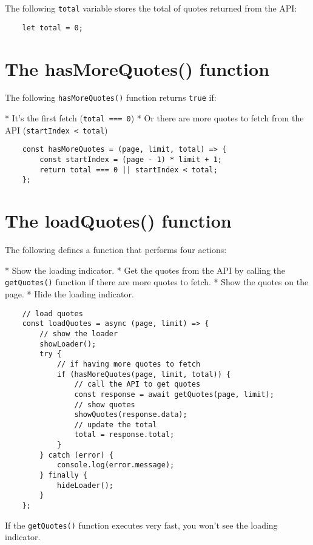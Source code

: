 \documentclass[11pt]{article}
\begin{document}
\noindent
The following \verb|total| variable stores the total of quotes
returned from the API:

\begin{lstlisting}
    let total = 0;
\end{lstlisting}

\section*{The hasMoreQuotes() function}

The following \verb|hasMoreQuotes()| function returns \verb|true| if:

* It's the first fetch (\verb|total === 0|)
* Or there are more quotes to fetch from the API (\verb|startIndex < total|)

\begin{lstlisting}
    const hasMoreQuotes = (page, limit, total) => {
        const startIndex = (page - 1) * limit + 1;
        return total === 0 || startIndex < total;
    };
\end{lstlisting}

\section*{The loadQuotes() function}

The following defines a function that performs four actions:

* Show the loading indicator.
* Get the quotes from the API by calling the \verb|getQuotes()| function
if there are more quotes to fetch.
* Show the quotes on the page.
* Hide the loading indicator.

\begin{lstlisting}
    // load quotes
    const loadQuotes = async (page, limit) => {
        // show the loader
        showLoader();
        try {
            // if having more quotes to fetch
            if (hasMoreQuotes(page, limit, total)) {
                // call the API to get quotes
                const response = await getQuotes(page, limit);
                // show quotes
                showQuotes(response.data);
                // update the total
                total = response.total;
            }
        } catch (error) {
            console.log(error.message);
        } finally {
            hideLoader();
        }
    };
\end{lstlisting}

If the \verb|getQuotes()| function executes very fast,
you won't see the loading indicator.
\newline
\end{document}

